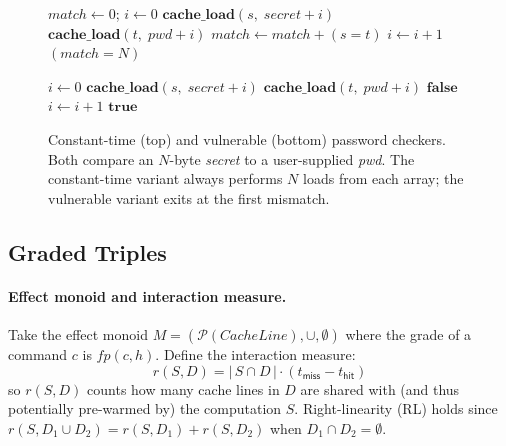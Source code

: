\begin{figure}[h]
\begin{algorithmic}[1]
  \State $\mathit{match} \gets 0$;\; $i \gets 0$
    \State $\mathbf{cache\_load}(s,\; \mathit{secret}+i)$
    \State $\mathbf{cache\_load}(t,\; \mathit{pwd}+i)$
    \State $\mathit{match} \gets \mathit{match} + (s = t)$
    \State $i \gets i + 1$
  \EndWhile
  \State \Return $(\mathit{match} = N)$
\EndProcedure
\end{algorithmic}
\smallskip
\begin{algorithmic}[1]
  \State $i \gets 0$
    \State $\mathbf{cache\_load}(s,\; \mathit{secret}+i)$
    \State $\mathbf{cache\_load}(t,\; \mathit{pwd}+i)$
     \Return $\mathbf{false}$ \EndIf  {}
    \State $i \gets i + 1$
  \EndWhile
  \State \Return $\mathbf{true}$
\EndProcedure
\end{algorithmic}
\caption{Constant-time (top) and vulnerable (bottom) password checkers.
Both compare an $N$-byte \emph{secret} to a user-supplied
\emph{pwd}.  The constant-time variant always performs $N$ loads from
each array; the vulnerable variant exits at the first mismatch.}
\label{fig:programs}
\end{figure}

\subsection{Graded Triples}

\paragraph{Effect monoid and interaction measure.}
Take the effect monoid $M = (\mathcal{P}(\mathit{CacheLine}), \cup, \emptyset)$
where the grade of a command $c$ is $\mathit{fp}(c,h)$.
Define the interaction measure:
\begin{equation}
  r(S, D) = \bigl|\, S \cap D \,\bigr| \cdot (t_\mathsf{miss} - t_\mathsf{hit})
  \label{eq:interaction}
\end{equation}
so $r(S,D)$ counts how many cache lines in $D$ are shared with
(and thus potentially pre-warmed by) the computation $S$.
Right-linearity (RL) holds since $r(S, D_1 \cup D_2) = r(S,D_1) + r(S,D_2)$
when $D_1 \cap D_2 = \emptyset$.


